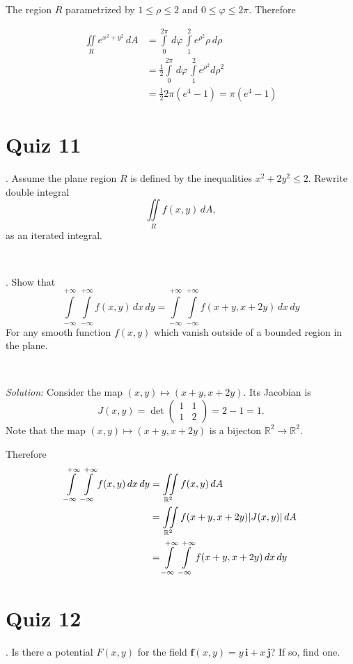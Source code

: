 \documentclass{article}
\def\RR{\mathbb{R}}%
\def\le{\leqslant}%
\def\phi{\varphi}%
\begin{document}
The region $R$ parametrized by $1\le\rho\le 2$ and $0\le\phi\le2\pi$.
Therefore 

\begin{align*}
\iint\limits_{R} e^{x^2+y^2}\,dA
&=
\int\limits_0^{2\pi}\,d\phi\,\int\limits_1^2 e^{\rho^2}\rho\,d\rho
\\
&=
\tfrac12\int\limits_0^{2\pi}\,d\phi\,\int\limits_1^2 e^{\rho^2}d\rho^2
\\
&=\tfrac12 2\pi(e^4-1)=\pi(e^4-1)
\end{align*}

\section*{
Quiz 11
}

. Assume the plane region $R$ is defined by the inequalities $x^2+2y^2\le 2$. Rewrite double integral 
\[\iint\limits_R f(x,y)\,dA,\] 
as an iterated integral.


\ 




. 
Show that 
\[\int\limits_{-\infty}^{+\infty}\,\int\limits_{-\infty}^{+\infty}f(x,y)\,dx\,dy
=
\int\limits_{-\infty}^{+\infty}\,\int\limits_{-\infty}^{+\infty}f(x+y,x+2y)\,dx\,dy\]
For any smooth function $f(x,y)$ which vanish outside of a bounded region in the plane.

\ 

\noindent\textit{Solution:}
Consider the map $(x,y)\mapsto (x+y,x+2y)$.
Its Jacobian is
\[J(x,y)=\det\left(
\begin{matrix}
1&1
\\
1&2
\end{matrix}\right)=2-1=1.
\]
Note that the map $(x,y)\mapsto (x+y,x+2y)$ is a bijecton $\RR^2\to\RR^2$.

Therefore
\begin{align*}
\int\limits\limits_{-\infty}^{+\infty}\,\int\limits\limits_{-\infty}^{+\infty}f(x,y)\,dx\,dy
&=
\iint\limits_{\RR^2}f(x,y)\,dA
\\
&=\iint\limits_{\RR^2}f(x+y,x+2y)|J(x,y)|\,dA
\\
&=\int\limits\limits_{-\infty}^{+\infty}\,\int\limits\limits_{-\infty}^{+\infty}f(x+y,x+2y)\,dx\,dy
\end{align*}

\section*{
Quiz 12
}

. Is there a potential $F(x,y)$ for the field $\mathbf{f}(x,y) = y\,\mathbf{i} + x\,\mathbf{j}$? If so, find one.
\end{document}
